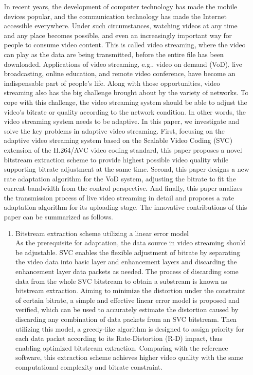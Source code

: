 \begin{eabstract}
In recent years, the development of computer technology has made the mobile devices popular, and the communication technology has made the Internet accessible everywhere. Under such circumstances, watching videos at any time and any place becomes possible, and even an increasingly important way for people to consume video content. This is called video streaming, where the video can play as the data are being transmitted, before the entire file has been downloaded. Applications of video streaming, e.g., video on demand (VoD), live broadcasting, online education, and remote video conference, have become an indispensable part of people's life. Along with those opportunities, video streaming also has the big challenge brought about by the variety of networks. To cope with this challenge, the video streaming system should be able to adjust the video’s bitrate or quality according to the network condition. In other words, the video streaming system needs to be adaptive. In this paper, we investigate and solve the key problems in adaptive video streaming. First, focusing on the adaptive video streaming system based on the Scalable Video Coding (SVC) extension of the H.264/AVC video coding standard, this paper proposes a novel bitstream extraction scheme to provide highest possible video quality while supporting bitrate adjustment at the same time. Second, this paper designs a new rate adaptation algorithm for the VoD system, adjusting the bitrate to fit the current bandwidth from the control perspective. And finally, this paper analizes the transmission process of live video streaming in detail and proposes a rate adaptation algorithm for its uploading stage. The innovative contributions of this paper can be summarized as follows.
\begin{enumerate}
\item {Bitstream extraction scheme utilizing a linear error model}\\
As the prerequisite for adaptation, the data source in video streaming should be adjustable. SVC enables the flexible adjustment of bitrate by separating the video data into basic layer and enhancement layers and discarding the enhancement layer data packets as needed. The process of discarding some data from the whole SVC bitstream to obtain a substream is known as bitstream extraction. Aiming to minimize the distortion under the constraint of certain bitrate, a simple and effective linear error model is proposed and verified, which can be used to accurately estimate the distortion caused by discarding any combination of data packets from an SVC bitstream. Then utilizing this model, a greedy-like algorithm is designed to assign priority for each data packet according to its Rate-Distortion (R-D) impact, thus enabling optimized bitstream extraction. Comparing with the reference software, this extraction scheme achieves higher video quality with the same computational complexity and bitrate constraint.

\end{enumerate}
\end{eabstract}
